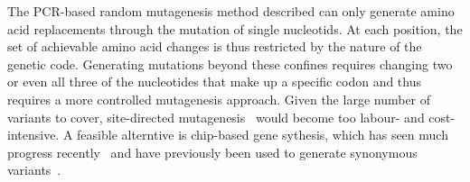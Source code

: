 \documentclass[12pt]{article}
\begin{document}
The PCR-based random mutagenesis method described can only generate amino acid replacements through the mutation of single nucleotids. At each position, the set of achievable amino acid changes is thus restricted by the nature of the genetic code. Generating mutations beyond these confines requires changing two or even all three of the nucleotides that make up a specific codon and thus requires a more controlled mutagenesis approach. Given the large number of variants to cover, site-directed mutagenesis~\cite{carter_site-directed_1986} would become too labour- and cost-intensive. A feasible alterntive is chip-based gene sythesis, which has seen much progress recently~\cite{kosuri_scalable_2010} and have previously been used to generate synonymous variants~\cite{quan_parallel_2011}.





\end{document}
